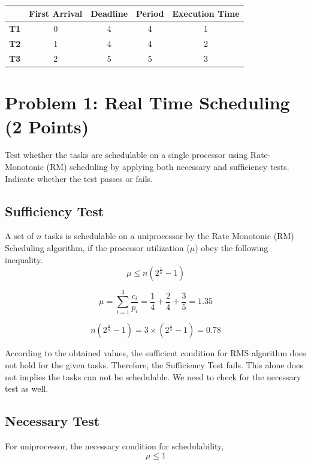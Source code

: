 \documentclass[11pt,letterpaper]{article}
\begin{document}
	\begin{table}[h]
		\centering
		\begin{tabular}{|c|c|c|c|c|}
			\hline
			& \textbf{First Arrival} & \textbf{Deadline} & \textbf{Period} & \textbf{Execution Time} \\ \hline
			\textbf{T1} & 0                      & 4                 & 4               & 1                       \\ \hline
			\textbf{T2} & 1                      & 4                 & 4               & 2                       \\ \hline
			\textbf{T3} & 2                      & 5                & 5              & 3                       \\ \hline
		\end{tabular}
	\end{table}
	
	\section*{Problem 1: Real Time Scheduling (2 Points)}
	
	Test whether the tasks are schedulable on a single processor using Rate-Monotonic (RM) scheduling by applying both necessary and sufficiency tests. Indicate whether the test passes or fails.
	
	\subsection*{Sufficiency Test}
	A set of $n$ tasks is schedulable on a uniprocessor by the Rate Monotonic (RM) Scheduling algorithm, if the processor utilization ($\mu$) obey the following inequality.
	\[	\mu \le n\left(2^{\frac{1}{n}} - 1\right) \]
	
	\[
	\mu  	
	= \sum_{i=1}^{3} \frac{c_i}{p_i}
	= \frac{1}{4} + \frac{2}{4} + \frac{3}{5}
	= 1.35
	\]
	
	\[
	n\left(2^{\frac{1}{n}} - 1\right)
	 = 3 \times \left(2^{\frac{1}{3}} - 1\right)
	 = 0.78
	\]
	
According to the obtained values, the sufficient condition for RMS algorithm does not hold for the given tasks. Therefore, the Sufficiency Test fails. This alone does not implies the tasks can not be schedulable. We need to check for the necessary test as well.

\subsection*{Necessary Test}
For uniprocessor, the necessary condition for schedulability,
\[\mu \le 1\]
\end{document}
